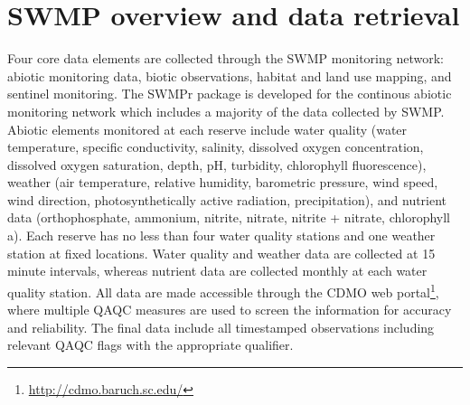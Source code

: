 \documentclass[10pt,letterpaper]{article}\usepackage[]{graphicx}\usepackage[]{color}
\begin{document}
\section*{SWMP overview and data retrieval}

Four core data elements are collected through the \ac{SWMP} monitoring network: abiotic monitoring data, biotic observations, habitat and land use mapping, and sentinel monitoring.  The SWMPr package is developed for the continous abiotic monitoring network which includes a majority of the data collected by \ac{SWMP}.  Abiotic elements monitored at each reserve include water quality (water temperature, specific conductivity, salinity, dissolved oxygen concentration, dissolved oxygen saturation, depth, pH, turbidity, chlorophyll fluorescence), weather (air temperature, relative humidity, barometric pressure, wind speed, wind direction, photosynthetically active radiation, precipitation), and nutrient data (orthophosphate, ammonium, nitrite, nitrate, nitrite + nitrate, chlorophyll a).  Each reserve has no less than four water quality stations and one weather station at fixed locations.  Water quality and weather data are collected at 15 minute intervals, whereas nutrient data are collected monthly at each water quality station.  All data are made accessible through the \ac{CDMO} web portal\footnote{\url{http://cdmo.baruch.sc.edu/}}, where multiple \ac{QAQC} measures are used to screen the information for accuracy and reliability.  The final data include all timestamped observations including relevant \ac{QAQC} flags with the appropriate qualifier.
\end{document}
